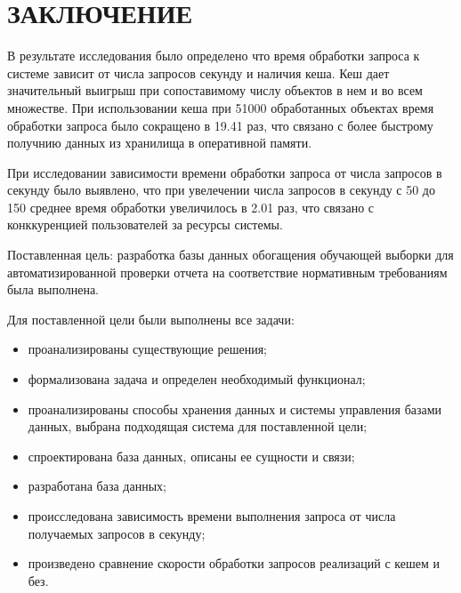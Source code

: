 \chapter*{\hfill{\centering  ЗАКЛЮЧЕНИЕ}\hfill}

В результате исследования было определено что время обработки запроса к системе зависит от числа запросов секунду и наличия кеша. Кеш дает значительный выигрыш при сопоставимому числу объектов в нем и во всем множестве. При использовании кеша при 51000 обработанных объектах время обработки запроса было сокращено в 19.41 раз, что связано с более быстрому получнию данных из хранилища в оперативной памяти.

При исследовании зависимости времени обработки запроса от числа запросов в секунду было выявлено, что при увелечении числа запросов в секунду с 50 до 150 среднее время обработки увеличилось в 2.01 раз, что связано с конккуренцией пользователей за ресурсы системы.

Поставленная цель: разработка базы данных обогащения обучающей выборки для автоматизированной проверки отчета на соответствие нормативным требованиям была выполнена.

Для поставленной цели были выполнены все задачи:
\begin{itemize}
	\item проанализированы существующие решения;
	\item формализована задача и определен необходимый функционал;
	\item проанализированы способы хранения данных и системы управления базами данных, выбрана подходящая система для поставленной цели;
	\item спроектирована база данных, описаны ее сущности и связи;
	\item разработана база данных;
	\item происследована зависимость времени выполнения запроса от числа получаемых запросов в секунду;
	\item произведено сравнение скорости обработки запросов реализаций с кешем и без.
\end{itemize}
